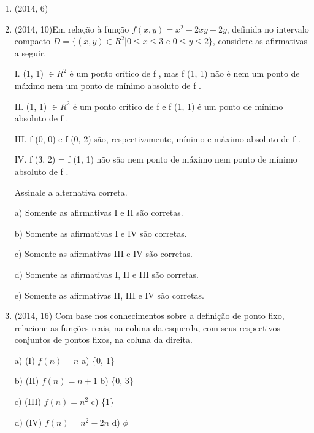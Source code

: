 \documentclass{article}
\begin{document}
\begin{enumerate}
\item(2014, 6) \newpage










\item(2014, 10)Em relação à função $f (x, y) = x^2 - 2xy + 2y$, definida no intervalo compacto $D = \{(x, y) \in R^2 | 0 \leq x \leq 3$ e $0 \leq y \leq 2\}$, considere as afirmativas a seguir.

I. (1, 1) $\in R^2$ é um ponto crítico de f , mas f (1, 1) não é nem um ponto de máximo nem um ponto de
mínimo absoluto de f .

II. (1, 1) $\in R^2$ é um ponto crítico de f e f (1, 1) é um ponto de mínimo absoluto de f .

III. f (0, 0) e f (0, 2) são, respectivamente, mínimo e máximo absoluto de f .

IV. f (3, 2) = f (1, 1) não são nem ponto de máximo nem ponto de mínimo absoluto de f .

Assinale a alternativa correta.

a) Somente as afirmativas I e II são corretas.


b) Somente as afirmativas I e IV são corretas.

c) Somente as afirmativas III e IV são corretas.

d) Somente as afirmativas I, II e III são corretas.

e) Somente as afirmativas II, III e IV são corretas.\newline







\item(2014, 16)
Com base nos conhecimentos sobre a definição de ponto fixo, relacione as funções reais, na coluna da
esquerda, com seus respectivos conjuntos de pontos fixos, na coluna da direita.

a) (I) $f (n) = n$  \hspace{70} a) \{0, 1\}

b) (II) $f (n) = n + 1$     \hspace{50} b) \{0, 3\}

c) (III) $f (n) = n^2 $    \hspace{60}     c) \{1\}

d) (IV) $f (n) = n^2 - 2n $  \hspace{37} d) $\phi$


\end{enumerate}
\end{document}
